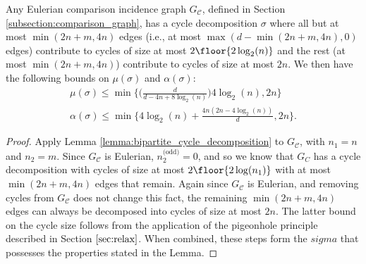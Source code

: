 \documentclass[10pt]{article}
\begin{document}
\begin{ReviewVerbatim}

		\begin{lemma}\label{lemma:Gc_cycle_decomposition}
			Any Eulerian comparison incidence graph $G_\mathcal{C}$, defined in Section \ref{subsection:comparison_graph}, has a cycle decomposition $\sigma$ where all but at most $\min(2n+m, 4n)$ edges (i.e., at most $\max(d-\min(2n+m, 4n), 0)$ edges) contribute to cycles of size at most $2\floor{2 \log_2(n)}$ and the rest (at most $\min(2n+m, 4n)$) contribute to cycles of size at most $2n$. We then have the following bounds on $\mu(\sigma)$ and $\alpha(\sigma)$:
			\begin{align*}
			\mu(\sigma) \leq \min \Big\{\Big(\frac{d}{d - 4n + 8\log_2 (n)}\Big)4\log_2 (n), 2n\Big\} \\
			\alpha(\sigma) \leq \min \Big\{4 \log_2(n) + \frac{4n(2n - 4 \log_2(n))}{d}, 2n\Big\}.
			\end{align*}
		\end{lemma}
		\begin{proof}
			Apply Lemma \ref{lemma:bipartite_cycle_decomposition} to $G_\mathcal{C}$, with $n_1 = n$ and $n_2 = m$. Since $G_\mathcal{C}$ is Eulerian, $n_2^\text{(odd)} = 0$, and so we know that $G_C$ has a cycle decomposition with cycles of size at most $2 \floor{2 \log(n_1)}$ with at most $\min(2n + m, 4n)$ edges that remain. Again since $G_\mathcal{C}$ is Eulerian, and removing cycles from $G_\mathcal{C}$ does not change this fact, the remaining $\min(2n + m, 4n)$ edges can always be decomposed into cycles of size at most $2n$. The latter bound on the cycle size follows from the application of the pigeonhole principle described in Section $\ref{sec:relax}$. When combined, these steps form the $sigma$ that possesses the properties stated in the Lemma.


\end{proof}
\end{ReviewVerbatim}
\end{document}
